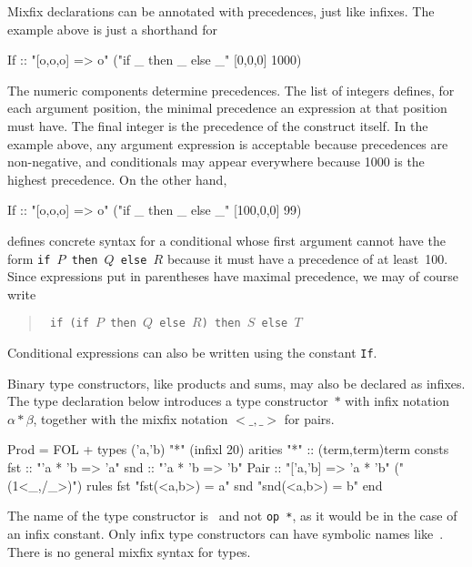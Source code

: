 Mixfix declarations can be annotated with precedences, just like
infixes.  The example above is just a shorthand for
\begin{ttbox}
        If :: "[o,o,o] => o"       ("if _ then _ else _" [0,0,0] 1000)
\end{ttbox}
The numeric components determine precedences.  The list of integers
defines, for each argument position, the minimal precedence an expression
at that position must have.  The final integer is the precedence of the
construct itself.  In the example above, any argument expression is
acceptable because precedences are non-negative, and conditionals may
appear everywhere because 1000 is the highest precedence.  On the other
hand,
\begin{ttbox}
        If :: "[o,o,o] => o"       ("if _ then _ else _" [100,0,0] 99)
\end{ttbox}
defines concrete syntax for a conditional whose first argument cannot have
the form {\tt if~$P$ then~$Q$ else~$R$} because it must have a precedence
of at least~100.  Since expressions put in parentheses have maximal
precedence, we may of course write
\begin{quote}\tt
if (if $P$ then $Q$ else $R$) then $S$ else $T$
\end{quote}
Conditional expressions can also be written using the constant {\tt If}.

Binary type constructors, like products and sums, may also be declared as
infixes.  The type declaration below introduces a type constructor~$*$ with
infix notation $\alpha*\beta$, together with the mixfix notation
${<}\_,\_{>}$ for pairs.  
\begin{ttbox}
Prod = FOL +
types   ('a,'b) "*"                           (infixl 20)
arities "*"     :: (term,term)term
consts  fst     :: "'a * 'b => 'a"
        snd     :: "'a * 'b => 'b"
        Pair    :: "['a,'b] => 'a * 'b"       ("(1<_,/_>)")
rules   fst     "fst(<a,b>) = a"
        snd     "snd(<a,b>) = b"
end
\end{ttbox}

\begin{warn}
The name of the type constructor is~{\tt *} and not {\tt op~*}, as it would
be in the case of an infix constant.  Only infix type constructors can have
symbolic names like~{\tt *}.  There is no general mixfix syntax for types.
\end{warn}


